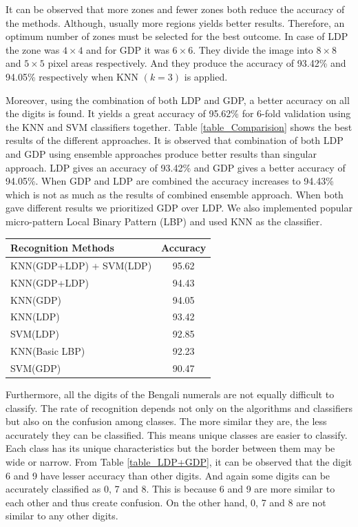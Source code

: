 \documentclass[conference]{IEEEtran}
\begin{document}
It can be observed that more zones and fewer zones both reduce the accuracy of the methods. Although, usually more regions yields better results. Therefore, an optimum number of zones must be selected for the best outcome. In case of LDP the zone was $4 \times 4$ and for GDP it was $6 \times 6$. They divide the image into $8 \times 8$ and $5 \times 5$ pixel areas respectively. And they produce the accuracy of 93.42\% and 94.05\% respectively when KNN $(k = 3)$ is applied.

Moreover, using the combination of both LDP and GDP, a better accuracy on all the digits is found. It yields a great accuracy of 95.62\% for 6-fold validation using the KNN and SVM classifiers together. Table \ref{table_Comparision} shows the best results of the different approaches. It is observed that combination of both LDP and GDP using ensemble approaches produce better results than singular approach. LDP gives an accuracy of 93.42\% and GDP gives a better accuracy of 94.05\%. When GDP and LDP are combined the accuracy increases to 94.43\% which is not as much as the results of combined ensemble approach. When both gave different results we prioritized GDP over LDP. We also implemented popular micro-pattern Local Binary Pattern (LBP)\cite{2002LBP,2015LBP} and used KNN as the classifier.

\begin{center}
	\label{table_Comparision}
	\begin{tabular}{lc}
		\hline
		Recognition Methods & Accuracy \\
		\hline
		KNN(GDP+LDP) + SVM(LDP) & 95.62\\
		KNN(GDP+LDP) & 94.43\\
		KNN(GDP) & 94.05 \\
		KNN(LDP) & 93.42 \\
		SVM(LDP) & 92.85 \\
		KNN(Basic LBP) & 92.23\\
		SVM(GDP) & 90.47 \\
		\hline
	\end{tabular}
\end{center}

Furthermore, all the digits of the Bengali numerals are not equally difficult to classify. The rate of recognition depends not only on the algorithms and classifiers but also on the confusion among classes. The more similar they are, the less accurately they can be classified. This means unique classes are easier to classify. Each class has its unique characteristics but the border between them may be wide or narrow. From Table \ref{table_LDP+GDP}, it can be observed that the digit 6 and 9 have lesser accuracy than other digits. And again some digits can be accurately classified as 0, 7 and 8. This is because 6 and 9 are more similar to each other and thus create confusion. On the other hand, 0, 7 and 8 are not similar to any other digits.
\end{document}

